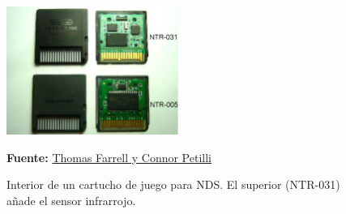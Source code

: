 \vspace{0.5cm}

 \begin{figure}[htbp]
\centering
  \includegraphics[width=0.5\textwidth]{archivos/gamecard.png}
  \caption{Interior de un cartucho de juego para NDS. El superior (NTR-031) añade el sensor infrarrojo.}
\textbf{Fuente:} \href{http://meseec.ce.rit.edu/551-projects/fall2015/3-1.pdf}{Thomas Farrell y Connor Petilli}
  \label{fig:gamecard}
\end{figure}














